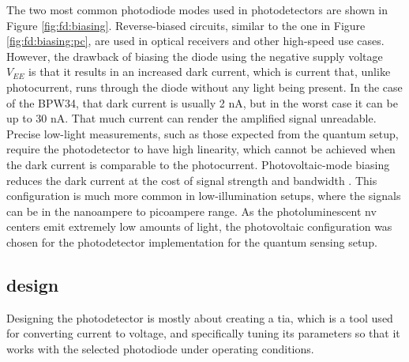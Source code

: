 The two most common photodiode modes used in photodetectors are shown in Figure \ref{fig:fd:biasing}. Reverse-biased circuits, similar to the one in Figure \ref{fig:fd:biasing:pc}, are used in optical receivers and other high-speed use cases. However, the drawback of biasing the diode using the negative supply voltage $V_{EE}$ is that it results in an increased dark current, which is current that, unlike photocurrent, runs through the diode without any light being present. In the case of the BPW34, that dark current is usually 2 \unit{\nano\ampere}, but in the worst case it can be up to 30 \unit{\nano\ampere}. That much current can render the amplified signal unreadable. Precise low-light measurements, such as those expected from the quantum setup, require the photodetector to have high linearity, which cannot be achieved when the dark current is comparable to the photocurrent. Photovoltaic-mode biasing reduces the dark current at the cost of signal strength and bandwidth \cite{photodiodephotodiode}. This configuration is much more common in low-illumination setups, where the signals can be in the nanoampere to picoampere range. As the photoluminescent \gls{nv} centers emit extremely low amounts of light, the photovoltaic configuration was chosen for the photodetector implementation for the quantum sensing setup. 



\subsection{ design} \label{chap:photodetection_design}
Designing the photodetector is mostly about creating a \gls{tia}, which is a tool used for converting current to voltage, and specifically tuning its parameters so that it works with the selected photodiode under operating conditions. 


